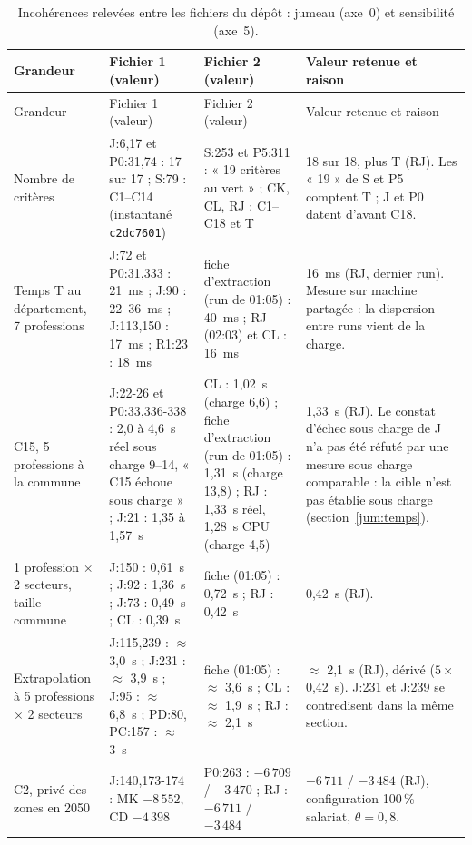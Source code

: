 {\small
\begin{longtable}{@{}p{2.9cm}p{3.5cm}p{3.5cm}p{4.7cm}@{}}
\caption{Incohérences relevées entre les fichiers du dépôt : jumeau (axe~0) et sensibilité (axe~5).}
\label{jum:tab:incoherences}\\
\toprule
Grandeur & Fichier 1 (valeur) & Fichier 2 (valeur) & Valeur retenue et raison \\
\midrule
\endfirsthead
\toprule
Grandeur & Fichier 1 (valeur) & Fichier 2 (valeur) & Valeur retenue et raison \\
\midrule
\endhead
\bottomrule
\endfoot
Nombre de critères & J:6,17 et P0:31,74 : 17 sur 17 ; S:79 : C1--C14 (instantané \texttt{c2dc7601}) & S:253 et
  P5:311 : « 19 critères au vert » ; CK, CL, RJ : C1--C18 et T & 18 sur 18, plus T (RJ). Les « 19 » de S et P5
  comptent T ; J et P0 datent d'avant C18. \\
Temps T au département, 7 professions & J:72 et P0:31,333 : 21~ms ; J:90 : 22--36~ms ; J:113,150 : 17~ms ; R1:23 :
  18~ms & fiche d'extraction (run de 01:05) : 40~ms ; RJ (02:03) et CL : 16~ms & 16~ms (RJ, dernier run). Mesure
  sur machine partagée : la dispersion entre runs vient de la charge. \\
C15, 5 professions à la commune & J:22-26 et P0:33,336-338 : 2,0 à 4,6~s réel sous charge 9--14, « C15 échoue
  sous charge » ; J:21 : 1,35 à 1,57~s & CL : 1,02~s (charge 6,6) ; fiche d'extraction (run de 01:05) : 1,31~s
  (charge 13,8) ; RJ : 1,33~s réel, 1,28~s CPU (charge 4,5) & 1,33~s (RJ). Le constat d'échec sous charge de J
  n'a pas été réfuté par une mesure sous charge comparable : la cible n'est pas établie sous charge
  (section~\ref{jum:temps}). \\
1 profession $\times$ 2 secteurs, taille commune & J:150 : 0,61~s ; J:92 : 1,36~s ; J:73 : 0,49~s ; CL : 0,39~s &
  fiche (01:05) : 0,72~s ; RJ : 0,42~s & 0,42~s (RJ). \\
Extrapolation à 5 professions $\times$ 2 secteurs & J:115,239 : $\approx$ 3,0~s ; J:231 : $\approx$ 3,9~s ;
  J:95 : $\approx$ 6,8~s ; PD:80, PC:157 : $\approx$ 3~s & fiche (01:05) : $\approx$ 3,6~s ; CL : $\approx$ 1,9~s ;
  RJ : $\approx$ 2,1~s & $\approx$ 2,1~s (RJ), dérivé ($5 \times$ 0,42~s). J:231 et J:239 se contredisent dans la
  même section. \\
C2, privé des zones en 2050 & J:140,173-174 : MK $-8\,552$, CD $-4\,398$ & P0:263 : $-6\,709$ / $-3\,470$ ; RJ :
  $-6\,711$ / $-3\,484$ & $-6\,711$ / $-3\,484$ (RJ), configuration 100\,\% salariat, $\theta = 0{,}8$. \\

\end{longtable}}
